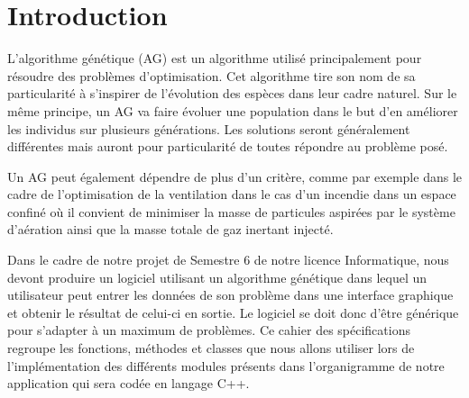 \documentclass[a4paper,11pt]{article}
\title{\vspace{13em}{\huge Cahier des Spécifications}}
\author{Edouard Fouassier - Maxime Gonthier - Benjamin Guillot\\
		Laureline Martin - Rémi Navarro - Lydia Rodrigez de la Nava
		\vspace{2em}\\
		Algorithme Génétique
		\vspace{2em}}
\begin{document}
	
	\clearpage
	\maketitle\vspace{13em}
\newpage
\tableofcontents
\newpage\clearpage{}
	
	\section{Introduction}
		L’algorithme génétique (AG) est un algorithme utilisé principalement pour résoudre des problèmes d’optimisation. 
		Cet algorithme tire son nom de sa particularité à s’inspirer de l’évolution des espèces dans leur cadre naturel.
		Sur le même principe, un AG va faire évoluer une population dans le but d’en améliorer les individus sur plusieurs générations.
		Les solutions seront généralement différentes mais auront pour particularité de toutes répondre au problème posé.

		Un AG peut également dépendre de plus d'un critère, comme par exemple dans le cadre de l'optimisation de la ventilation dans le cas d’un incendie dans un espace confiné où il convient de minimiser la masse de particules aspirées par le système d'aération ainsi que la masse totale de gaz inertant injecté.

		Dans le cadre de notre projet de Semestre 6 de notre licence Informatique, nous devont produire un logiciel utilisant un algorithme génétique dans lequel un utilisateur peut entrer les données de son problème dans une interface graphique et obtenir le résultat de celui-ci en sortie. Le logiciel se doit donc d'être générique pour s'adapter à un maximum de problèmes.
		Ce cahier des spécifications regroupe les fonctions, méthodes et classes que nous allons utiliser lors de l’implémentation des différents modules présents dans l'organigramme de notre application qui sera codée en langage C++.
\end{document}
